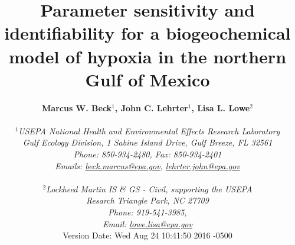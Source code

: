 \documentclass[letterpaper,12pt,oneside]{article}\usepackage[]{graphicx}\usepackage[]{color}
\begin{document}
\raggedbottom
\linenumbers
\raggedright
{}
\setlength{\parindent}{0.5in}
\renewcommand\refname{References \vspace{12pt}}

\begin{singlespace}
\title{{\bf {\Large Parameter sensitivity and identifiability for a biogeochemical model of hypoxia in the northern {G}ulf of {M}exico}}}
\author{
  {\bf {\normalsize Marcus W. Beck$^1$, John C. Lehrter$^1$, Lisa L. Lowe$^2$}}
  \\\\{\textit {\normalsize $^1$USEPA National Health and Environmental Effects Research Laboratory}}
  \\{\textit {\normalsize Gulf Ecology Division, 1 Sabine Island Drive, Gulf Breeze, FL 32561}}
	\\{\textit {\normalsize Phone: 850-934-2480, Fax: 850-934-2401}}
	\\{\textit {\normalsize Emails: \href{mailto:beck.marcus@epa.gov}{beck.marcus@epa.gov}, \href{mailto:lehrter.john@epa.gov}{lehrter.john@epa.gov}}}
	\\\\{\textit {\normalsize $^2$Lockheed Martin IS \& GS - Civil, supporting the USEPA}}
	\\{\textit {\normalsize Resarch Triangle Park, NC 27709}}
	\\{\textit {\normalsize Phone: 919-541-3985,}}
	\\{\textit {\normalsize Email: \href{mailto:lowe.lisa@epa.gov}{lowe.lisa@epa.gov}}}
  \vspace{1in} 
  \\ Version Date:   Wed Aug 24 10:41:50 2016 -0500
	}
\date{}
\maketitle
\end{singlespace}
\clearpage
\end{document}
